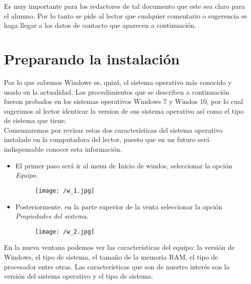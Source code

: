 \documentclass[a4paper, openright, 12pt]{article}
\begin{document}
    Es muy importante para los redactores de tal documento que este sea claro para el alumno. Por lo tanto se pide al lector que cualquier comentario o sugerencia se haga llegar a los datos de contacto que aparecen a continuación.

\newpage{}



  \section{Preparando la instalación}
    Por lo que sabemos Windows es, quizá, el sistema operativo más conocido y usado en la actualidad. Los procedimientos que se describen a continuación fueron probados en los sistemas operativos Windows 7 y Windos 10, por lo cual sugerimos al lector identicar la version de sus sistema operativo así como el tipo de sistema que tiene.\\

    Comenzaremos por revisar estas dos características del sistema operativo instalado en la cumputadora del lector, puesto que en un futuro será indispensable conocer esta información.\\

    \begin{itemize}

      \item{El primer paso será ir al menu de Inicio de windos, seleccionar la opción \textit{Equipo}.}

      \begin{figure}[ht]
        \centering
        \texttt{[image: /w\_1.jpg]}
      \end{figure}

      \item{Posteriormente, en la parte superior de la venta seleccionar la opción \textit{Propiedades del sistema}.}\\

      \begin{figure}[ht]
        \centering
        \texttt{[image: /w\_2.jpg]}
      \end{figure}

    \end{itemize}

    En la nueva ventana podemos ver las características del equipo: la versión de Windows, el tipo de sistema, el tamaño de la memoria RAM, el tipo de procesador entre otras. Las características que son de nuestro interés son la versión del sistema operativo y el tipo de sistema.\\
\end{document}
